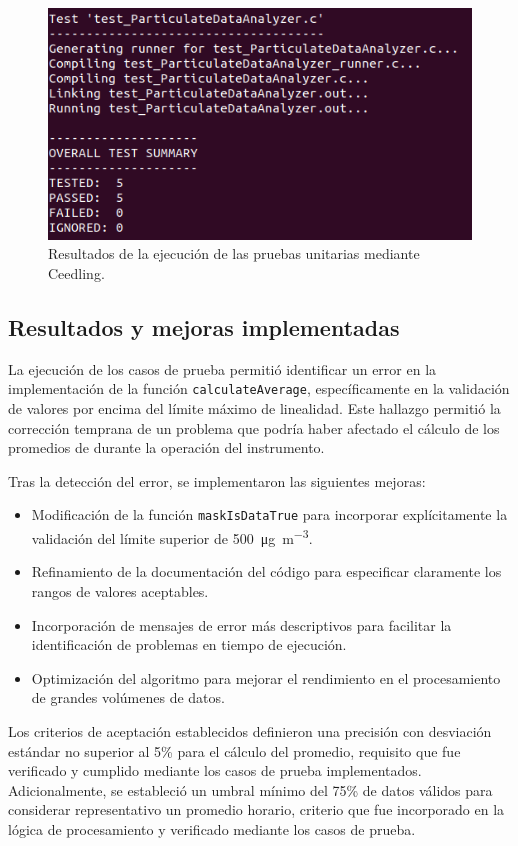 \begin{figure}[h]
	\centering
	\includegraphics[width=0.7\linewidth]{Figures/captura_ceedling}
	\caption{Resultados de la ejecución de las pruebas unitarias mediante Ceedling.}
	\label{fig:resultados-pruebas}
\end{figure}

\subsection{Resultados y mejoras implementadas}

La ejecución de los casos de prueba permitió identificar un error en la implementación de la función \texttt{calculateAverage}, específicamente en la validación de valores por encima del límite máximo de linealidad. Este hallazgo permitió la corrección temprana de un problema que podría haber afectado el cálculo de los promedios de \MPF durante la operación del instrumento.

Tras la detección del error, se implementaron las siguientes mejoras:

\begin{itemize}
	\item Modificación de la función \texttt{maskIsDataTrue} para incorporar explícitamente la validación del límite superior de \SI{500}{\micro\gram\per\cubic\meter}.
	\item Refinamiento de la documentación del código para especificar claramente los rangos de valores aceptables.
	\item Incorporación de mensajes de error más descriptivos para facilitar la identificación de problemas en tiempo de ejecución.
	\item Optimización del algoritmo para mejorar el rendimiento en el procesamiento de grandes volúmenes de datos.
\end{itemize}

Los criterios de aceptación establecidos definieron una precisión con desviación estándar no superior al 5\% para el cálculo del promedio, requisito que fue verificado y cumplido mediante los casos de prueba implementados. Adicionalmente, se estableció un umbral mínimo del 75\% de datos válidos para considerar representativo un promedio horario, criterio que fue incorporado en la lógica de procesamiento y verificado mediante los casos de prueba.

